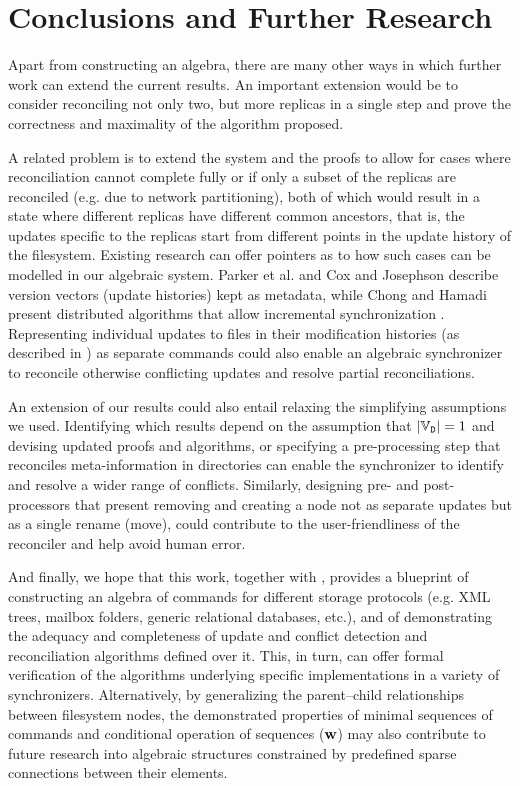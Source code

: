 
\section{Conclusions and Further Research}

Apart from constructing an algebra,
there are many other ways in which further work can extend the current results.
An important extension would be to
consider reconciling not only two, but more replicas in a single step and
prove the correctness and maximality of the algorithm proposed.

A related problem is to extend the system and the proofs
to allow for cases where reconciliation cannot
complete fully
or if only a subset of the replicas are reconciled 
(e.g. due to network partitioning),
both of which would result in a state where different replicas
have different common ancestors, that is,
the updates specific to the replicas start from different points
in the update history of the filesystem.
Existing research can offer pointers as to how such cases can be modelled
in our algebraic system.
Parker et al. \cite{PPRS} and Cox and Josephson \cite{CJ}
describe version vectors (update histories) kept as metadata,
while Chong and Hamadi present distributed algorithms that allow incremental synchronization \cite{CH}.
Representing individual updates to files
in their modification histories (as described in \cite{CJ})
as separate commands could also enable an algebraic synchronizer to reconcile otherwise
conflicting updates and resolve partial reconciliations.

An extension of our results could also entail relaxing
the simplifying assumptions we used.
Identifying which results depend on the assumption that $|\mathbb{V}_{\mathtt{D}}|=1$
and devising updated proofs and algorithms,
or specifying a pre-processing step that reconciles meta-information in directories
can enable the synchronizer
to identify and resolve a wider range of conflicts.
Similarly, designing pre- and post-processors that
present removing and creating a node
not as separate updates but as a single rename (move),
could contribute to the user-friendliness of the reconciler
and help avoid human error.

And finally, we hope that this work, together with \cite{NREC}, provides
a blueprint of constructing an algebra of commands for different storage protocols
(e.g. XML trees, mailbox folders, generic relational databases, etc.),
and of demonstrating the adequacy and completeness of update and conflict detection and reconciliation
algorithms defined over it.
This, in turn, can offer formal verification of the algorithms underlying
specific implementations in a variety of synchronizers.
Alternatively, by generalizing the parent--child relationships between filesystem nodes,
the demonstrated properties of minimal sequences of commands
and conditional operation of sequences ($\mathbf{w}$)
may also contribute to future research into algebraic structures
constrained by predefined sparse connections between their elements.
